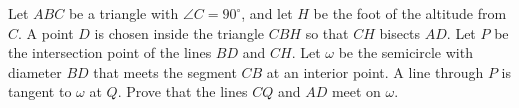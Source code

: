 Let 
$ABC$
 be a triangle with 
$\angle{C} = 90^{\circ}$, 
 and let 
$H$
 be the foot of the altitude from 
$C$.
 A point 
$D$
 is chosen inside the triangle 
$CBH$
 so that 
$CH$
 bisects 
$AD$.
 Let 
$P$
 be the intersection point of the lines 
$BD$
 and 
$CH$.
 Let 
$\omega$
 be the semicircle with diameter 
$BD$
 that meets the segment 
$CB$
 at an interior point. A line through 
$P$
 is tangent to 
$\omega$
 at 
$Q$.
 Prove that the lines 
$CQ$
 and 
$AD$
 meet on 
$\omega$.
